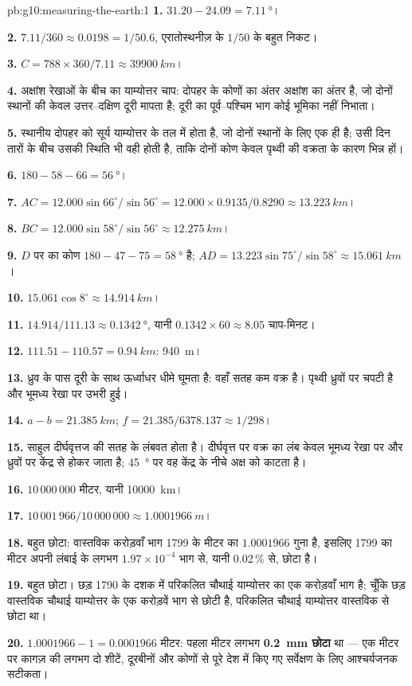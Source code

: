 \begin{solution}{pb:g10:measuring-the-earth:1}
\textbf{1.} $31.20 - 24.09 = \qty{7.11}{\degree}$।

\textbf{2.} $7.11/360 \approx 0.0198 = 1/50.6$, एरातोस्थनीज़ के $1/50$ के
बहुत निकट।

\textbf{3.} $C = 788 \times 360/7.11 \approx \qty{39900}{km}$।

\textbf{4.} अक्षांश रेखाओं के बीच का याम्योत्तर चाप: दोपहर के कोणों का अंतर अक्षांश का
अंतर है, जो दोनों स्थानों की केवल उत्तर--दक्षिण दूरी मापता है; दूरी का पूर्व--पश्चिम
भाग कोई भूमिका नहीं निभाता।

\textbf{5.} स्थानीय दोपहर को सूर्य याम्योत्तर के तल में होता है, जो दोनों स्थानों के लिए एक
ही है; उसी दिन तारों के बीच उसकी स्थिति भी वही होती है, ताकि दोनों कोण केवल पृथ्वी की
वक्रता के कारण भिन्न हों।

\textbf{6.} $180 - 58 - 66 = \qty{56}{\degree}$।

\textbf{7.} $AC = 12.000 \sin 66^\circ/\sin 56^\circ = 12.000 \times
0.9135/0.8290 \approx \qty{13.223}{km}$।

\textbf{8.} $BC = 12.000 \sin 58^\circ/\sin 56^\circ \approx \qty{12.275}{km}$।

\textbf{9.} $D$ पर का कोण $180 - 47 - 75 = \qty{58}{\degree}$ है;
$AD = 13.223 \sin 75^\circ/\sin 58^\circ \approx \qty{15.061}{km}$।

\textbf{10.} $15.061 \cos 8^\circ \approx \qty{14.914}{km}$।

\textbf{11.} $14.914/111.13 \approx \qty{0.1342}{\degree}$, यानी
$0.1342 \times 60 \approx 8.05$ चाप-मिनट।

\textbf{12.} $111.51 - 110.57 = \qty{0.94}{km}$: \qty{940}{m}।

\textbf{13.} ध्रुव के पास दूरी के साथ ऊर्ध्वाधर धीमे घूमता है: वहाँ सतह कम वक्र है।
पृथ्वी ध्रुवों पर चपटी है और भूमध्य रेखा पर उभरी
हुई।

\textbf{14.} $a - b = \qty{21.385}{km}$; $f = 21.385/6378.137 \approx 1/298$।

\textbf{15.} साहुल दीर्घवृत्तज की सतह के लंबवत होता है। दीर्घवृत्त पर वक्र का लंब केवल
भूमध्य रेखा पर और ध्रुवों पर केंद्र से होकर जाता है; \qty{45}{\degree} पर वह
केंद्र के नीचे अक्ष को काटता है।

\textbf{16.} $10\,000\,000$ मीटर, यानी \qty{10000}{km}।

\textbf{17.} $10\,001\,966/10\,000\,000 \approx \qty{1.0001966}{m}$।

\textbf{18.} बहुत छोटा: वास्तविक करोड़वाँ भाग 1799 के मीटर का $1.0001966$ गुना है,
इसलिए 1799 का मीटर अपनी लंबाई के लगभग $1.97 \times 10^{-4}$ भाग से, यानी
0.02\,\% से, छोटा है।

\textbf{19.} बहुत छोटा। छड़ 1790 के दशक में परिकलित चौथाई याम्योत्तर का एक
करोड़वाँ भाग है; चूँकि छड़ वास्तविक चौथाई याम्योत्तर के एक करोड़वें भाग से छोटी है,
परिकलित चौथाई याम्योत्तर वास्तविक से छोटा था।

\textbf{20.} $1.0001966 - 1 = 0.0001966$ मीटर: पहला मीटर लगभग
\textbf{\qty{0.2}{mm} छोटा} था --- एक मीटर पर कागज़ की लगभग दो शीटें, दूरबीनों और
कोणों से पूरे देश में किए गए सर्वेक्षण के लिए आश्चर्यजनक सटीकता।
\end{solution}
